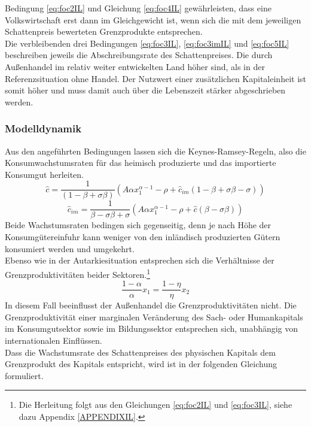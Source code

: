%
Bedingung \eqref{eq:foc2IL} und Gleichung \eqref{eq:foc4IL} gewährleisten, dass eine Volkswirtschaft erst dann im Gleichgewicht ist, wenn sich die mit dem jeweiligen Schattenpreis bewerteten Grenzprodukte entsprechen.\\
%
Die verbleibenden drei Bedingungen \eqref{eq:foc3IL}, \eqref{eq:foc3imIL} und \eqref{eq:foc5IL} beschreiben jeweils die Abschreibungsrate des Schattenpreises. Die durch Außenhandel im relativ weiter entwickelten Land höher sind, als in der Referenzsituation ohne Handel. Der Nutzwert einer zusätzlichen Kapitaleinheit ist somit höher und muss damit auch über die Lebenszeit stärker abgeschrieben werden. 
%
\subsubsection*{Modelldynamik}
Aus den angeführten Bedingungen lassen sich die Keynes-Ramsey-Regeln, also die Konsumwachstumsraten für das heimisch produzierte und das importierte Konsumgut herleiten. 
%
\begin{equation}
	\boxed{
	\hat{c}=\frac{1}{(1-\beta+\sigma\beta)}\left(A\alpha x_1^{\alpha -1}-\rho+\hat{c}_{im}(1-\beta+\sigma\beta-\sigma)\right)
	}
\end{equation}
%
\begin{equation}
	\boxed{
	\hat{c}_{im}=\frac{1}{\beta-\sigma\beta+ \sigma}\left(A\alpha x_1^{\alpha -1}-\rho+\hat{c}(\beta - \sigma\beta)\right)
	}
\end{equation}
%
Beide Wachstumsraten bedingen sich gegenseitig, denn je nach Höhe der Konsum\-güter\-einfuhr kann weniger von den inländisch produzierten Gütern konsumiert werden und umgekehrt.\\
%
Ebenso wie in der Autarkiesituation entsprechen sich die Verhältnisse der Grenzproduktivitäten beider Sektoren.\footnote{Die Herleitung folgt aus den Gleichungen \eqref{eq:foc2IL} und \eqref{eq:foc3IL}, siehe dazu Appendix \ref{APPENDIXIL}.}
%
\begin{equation}
	\boxed{\frac{1-\alpha}{\alpha}x_1=\frac{1-\eta}{\eta}x_2}
\end{equation}
%
In diesem Fall beeinflusst der Außenhandel die Grenzproduktivitäten nicht. Die Grenzproduktivität einer marginalen Veränderung des Sach- oder Humankapitals im Konsumgutsektor sowie im Bildungssektor entsprechen sich, unabhängig von internationalen Einflüssen.\\
%
Dass die Wachstumsrate des Schattenpreises des physischen Kapitals dem Grenzprodukt des Kapitals entspricht, wird ist in der folgenden Gleichung formuliert. 
